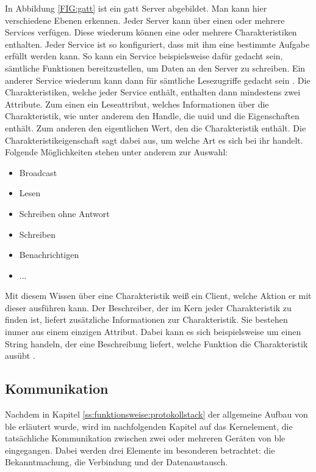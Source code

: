 \noindent In Abbildung \ref{FIG:gatt} ist ein \ac{gatt} Server abgebildet. Man kann hier verschiedene Ebenen erkennen. Jeder Server kann über einen oder mehrere Services verfügen. Diese wiederum können eine oder mehrere Charakteristiken enthalten. Jeder Service ist so konfiguriert, dass mit ihm eine bestimmte Aufgabe erfüllt werden kann. So kann ein Service beispielsweise dafür gedacht sein, sämtliche Funktionen bereitzustellen, um Daten an den Server zu schreiben. Ein anderer Service wiederum kann dann für sämtliche Lesezugriffe gedacht sein \cite[Seite 32]{Usama17:BBS}. Die Charakteristiken, welche jeder Service enthält, enthalten dann mindestens zwei Attribute. Zum einen ein Leseattribut, welches Informationen über die Charakteristik, wie unter anderem den Handle, die \ac{uuid} und die Eigenschaften enthält. Zum anderen den eigentlichen Wert, den die Charakteristik enthält. Die Charakteristikeigenschaft sagt dabei aus, um welche Art es sich bei ihr handelt. Folgende Möglichkeiten stehen unter anderem zur Auswahl: 
\begin{itemize}
	\item{Broadcast}
	\item{Lesen}
	\item{Schreiben ohne Antwort}
	\item{Schreiben}
	\item{Benachrichtigen}
	\item{...}
\end{itemize} 
Mit diesem Wissen über eine Charakteristik weiß ein Client, welche Aktion er mit dieser ausführen kann. Der Beschreiber, der im Kern jeder Charakteristik zu finden ist, liefert zusätzliche Informationen zur Charakteristik. Sie bestehen immer aus einem einzigen Attribut. Dabei kann es sich beispielsweise um einen String handeln, der eine Beschreibung liefert, welche Funktion die Charakteristik ausübt \cite[Seite 59ff]{Townsend14:GSB}.\\ 

\subsection{Kommunikation}
\label{ss:funktionsweise:kommunkation}

Nachdem in Kapitel \ref{ss:funktionsweise:protokollstack} der allgemeine Aufbau von \ac{ble} erläutert wurde, wird im nachfolgenden Kapitel auf das Kernelement, die tatsächliche Kommunikation zwischen zwei oder mehreren Geräten von \ac{ble} eingegangen. Dabei werden drei Elemente im besonderen betrachtet: die Bekanntmachung, die Verbindung und der Datenaustausch.\\


